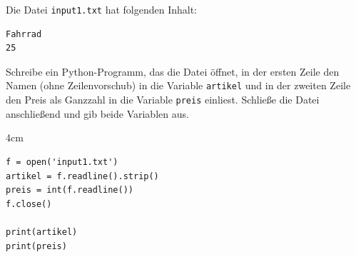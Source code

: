 \question[4]
Die Datei \texttt{input1.txt} hat folgenden Inhalt:
\begin{lstlisting}
Fahrrad
25
\end{lstlisting}
Schreibe ein Python-Programm, das die Datei öffnet, in der ersten Zeile den Namen
(ohne Zeilenvorschub) in die Variable \texttt{artikel} und in der zweiten Zeile den
Preis als Ganzzahl in die Variable \texttt{preis} einliest. Schließe die Datei
anschließend und gib beide Variablen aus.

\begin{solutionbox}{4cm}
\begin{lstlisting}
f = open('input1.txt')
artikel = f.readline().strip()
preis = int(f.readline())
f.close()

print(artikel)
print(preis)
\end{lstlisting}
\end{solutionbox}